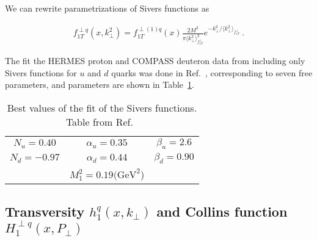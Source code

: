 \documentclass[a4paper,11pt]{article}
\newcommand{\ba}{\begin{eqnarray}}
\newcommand{\ea}{\end{eqnarray}}
\newcommand{\la}{\langle}
\newcommand{\ra}{\rangle}
\def\kperp{k_\perp}
\def\avkperp{\la \kperp^2 \ra}
\begin{document}
We can rewrite parametrizations of Sivers functions as

\ba
f_{1T}^{\perp q}(x,\kperp^2) =  f_{1T}^{\perp (1) q}(x)   \frac{2 M^2}{\pi \avkperp_{f_{1T}^\perp}^2} e^{-\kperp^2/{\avkperp_{f_{1T}^\perp}}}
\label{sivers_new} \ .
\ea

The fit the HERMES proton and COMPASS deuteron data from 
including only Sivers functions for $u$ and $d$ quarks was done in Ref.~\cite{Anselmino:2011gs},
corresponding to seven free parameters, and parameters are shown in Table~\ref{tab:a}.


\begin{table}
\centering
\begin{tabular}{ccc}
\hline
$N_u=0.40$ & $\alpha_u=0.35$ & $\beta_u=2.6$ \\
$N_d=-0.97$ & $\alpha_d=0.44$ & $\beta_d=0.90$\\
& $M_1^2=0.19\textrm{(GeV}^2$) &   \\
\hline
\end{tabular}
\caption{Best values of the fit of the Sivers functions. Table from Ref.~\cite{Anselmino:2011gs}}
\label{tab:a}
\end{table}



\subsection{\boldmath Transversity $h_{1}^{q}(x,k_\perp)$ and 
Collins function $H_{1}^{\perp q}(x,P_\perp)$}
\label{App:basis-h1-H1perp}
\end{document}
